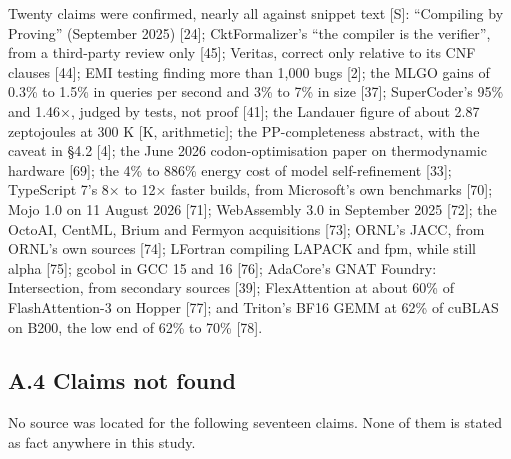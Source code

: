 \documentclass[10pt,letterpaper]{article}
\begin{document}
Twenty claims were confirmed, nearly all against snippet text {[}S{]}:
``Compiling by Proving'' (September 2025) {[}24{]}; CktFormalizer's
``the compiler is the verifier'', from a third-party review only
{[}45{]}; Veritas, correct only relative to its CNF clauses {[}44{]};
EMI testing finding more than 1,000 bugs {[}2{]}; the MLGO gains of
0.3\% to 1.5\% in queries per second and 3\% to 7\% in size {[}37{]};
SuperCoder's 95\% and 1.46×, judged by tests, not proof {[}41{]}; the
Landauer figure of about 2.87 zeptojoules at 300 K {[}K, arithmetic{]};
the PP-completeness abstract, with the caveat in §4.2 {[}4{]}; the June
2026 codon-optimisation paper on thermodynamic hardware {[}69{]}; the
4\% to 886\% energy cost of model self-refinement {[}33{]}; TypeScript
7's 8× to 12× faster builds, from Microsoft's own benchmarks {[}70{]};
Mojo 1.0 on 11 August 2026 {[}71{]}; WebAssembly 3.0 in September 2025
{[}72{]}; the OctoAI, CentML, Brium and Fermyon acquisitions {[}73{]};
ORNL's JACC, from ORNL's own sources {[}74{]}; LFortran compiling LAPACK
and fpm, while still alpha {[}75{]}; gcobol in GCC 15 and 16 {[}76{]};
AdaCore's GNAT Foundry: Intersection, from secondary sources {[}39{]};
FlexAttention at about 60\% of FlashAttention-3 on Hopper {[}77{]}; and
Triton's BF16 GEMM at 62\% of cuBLAS on B200, the low end of 62\% to
70\% {[}78{]}.

\subsection{A.4 Claims not found}\label{a.4-claims-not-found}

No source was located for the following seventeen claims. None of them
is stated as fact anywhere in this study.
\end{document}
